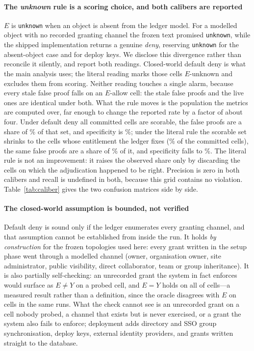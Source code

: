 \paragraph{The \emph{unknown} rule is a scoring choice, and both calibers are reported}
$E$ is \texttt{unknown} when an object is absent from the ledger model. For a
modelled object with no recorded granting channel the frozen text promised
\texttt{unknown}, while the shipped implementation returns a genuine \emph{deny},
reserving \texttt{unknown} for the absent-object case and for deploy keys. We disclose
this divergence rather than reconcile it silently, and report both readings. Closed-world
default deny is what the main analysis uses; the literal reading marks those cells
$E$-unknown and excludes them from scoring. Neither reading touches a single alarm,
because every stale false proof falls on an $E$-allow cell: the \TmpBothStaleFP{}
stale false proofs and the \TmpBothLiveFP{} live ones are identical under both.
What the rule moves is the population the metrics are computed over, far enough to
change the reported rate by a factor of about four. Under default deny all
\TmpBothCells{} committed cells are scorable, the \TmpBothStaleFP{} false proofs are
a share of \CalImpShare{}\% of that set, and specificity is \CalImpSpec{}\%; under
the literal rule the scorable set shrinks to the \TmpBothLitKnown{} cells whose
entitlement the ledger fixes (\CalLitCov{}\% of the committed cells), the same false
proofs are a share of \CalLitShare{}\%
of it, and specificity falls to \CalLitSpec{}\%. The literal rule is not an
improvement: it raises the observed share only by discarding the \TmpBothLitUnk{}
cells on which the adjudication happened to be right. Precision is zero in both
calibers and recall is undefined in both, because this grid contains no violation.
Table~\ref{tab:caliber} gives the two confusion matrices side by side.



\paragraph{The closed-world assumption is bounded, not verified}
Default deny is sound only if the ledger enumerates every granting channel, and that
assumption cannot be established from inside the run. It holds \emph{by construction} for the
frozen topologies used here: every grant written in the setup phase went through a modelled
channel (owner, organisation owner, site administrator, public visibility, direct
collaborator, team or group inheritance). It is also partially self-checking: an unrecorded
grant the system in fact enforces would surface as $E\neq Y$ on a probed cell, and $E=Y$ holds
on all \TmpBothEeqY{} of \TmpBothCells{} cells---a measured result rather than a definition,
since the oracle disagrees with $E$ on \TmpBothOracleDisagree{} cells in the same runs. What
the check cannot see is an unrecorded grant on a cell nobody probed, a channel that exists but
is never exercised, or a grant the system also fails to enforce; deployment adds directory and
SSO group synchronisation, deploy keys, external identity providers, and grants written
straight to the database.

